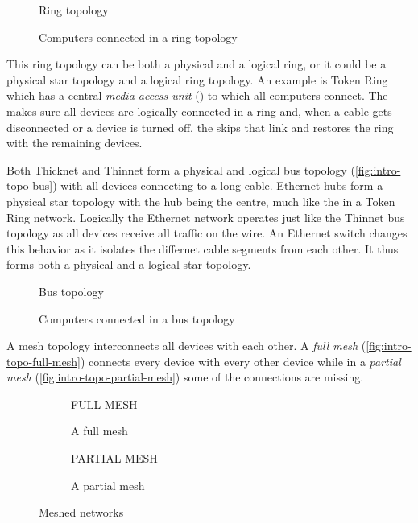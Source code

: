 \begin{figure}
   \centering
   Ring topology
   \caption{Computers connected in a ring topology}
   \label{fig:intro-topo-ring}
\end{figure}


This ring topology can be both a physical and a logical ring, or it could be a physical star topology and a logical ring topology.
An example is Token Ring which has a central \emph{media access unit} () to which all computers connect.
The  makes sure all devices are logically connected in a ring and, when a cable gets disconnected or a device is turned off, the  skips that link and restores the ring with the remaining devices.

Both Thicknet and Thinnet form a physical and logical bus topology (\vref{fig:intro-topo-bus}) with all devices connecting to a long cable.
Ethernet hubs form a physical star topology with the hub being the centre, much like the  in a Token Ring network.
Logically the Ethernet network operates just like the Thinnet bus topology as all devices receive all traffic on the wire.
An Ethernet switch changes this behavior as it isolates the differnet cable segments from each other.
It thus forms both a physical and a logical star topology.


\begin{figure}
   \centering
   Bus topology
   \caption{Computers connected in a bus topology}
   \label{fig:intro-topo-bus}
\end{figure}

A mesh topology interconnects all devices with each other.
A \emph{full mesh} (\vref{fig:intro-topo-full-mesh}) connects every device with every other device while in a \emph{partial mesh} (\vref{fig:intro-topo-partial-mesh}) some of the connections are missing.


\begin{figure}
   \begin{subfigure}[b]{.47\textwidth}
      \centering
      FULL MESH
      \caption{A full mesh}
      \label{fig:intro-topo-full-mesh}
   \end{subfigure}
   \hfill
   \begin{subfigure}[b]{.47\textwidth}
      \centering
      PARTIAL MESH
      \caption{A partial mesh}
      \label{fig:intro-topo-partial-mesh}
   \end{subfigure}
   \caption{Meshed networks}
   \label{fig:intro-topo-mesh}
\end{figure}



